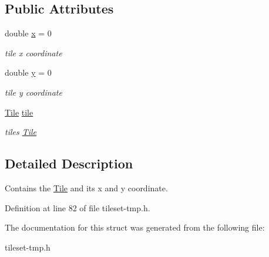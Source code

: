 \subsection*{Public Attributes}
\begin{DoxyCompactItemize}
\item 
double \hyperlink{structTileset_1_1tile_a1ef99a135c4524cdb6074f4f465e11fb}{x} = 0\hypertarget{structTileset_1_1tile_a1ef99a135c4524cdb6074f4f465e11fb}{}\label{structTileset_1_1tile_a1ef99a135c4524cdb6074f4f465e11fb}

\begin{DoxyCompactList}\small\item\em tile x coordinate \end{DoxyCompactList}\item 
double \hyperlink{structTileset_1_1tile_af375f25f2d48ed50fc5ce94f382d0f1e}{y} = 0\hypertarget{structTileset_1_1tile_af375f25f2d48ed50fc5ce94f382d0f1e}{}\label{structTileset_1_1tile_af375f25f2d48ed50fc5ce94f382d0f1e}

\begin{DoxyCompactList}\small\item\em tile y coordinate \end{DoxyCompactList}\item 
\hyperlink{classTile}{Tile} \hyperlink{structTileset_1_1tile_a31c903cd12d0f061e2e0c7b8c3577153}{tile}\hypertarget{structTileset_1_1tile_a31c903cd12d0f061e2e0c7b8c3577153}{}\label{structTileset_1_1tile_a31c903cd12d0f061e2e0c7b8c3577153}

\begin{DoxyCompactList}\small\item\em tile\textquotesingle{}s \hyperlink{classTile}{Tile} \end{DoxyCompactList}\end{DoxyCompactItemize}


\subsection{Detailed Description}
Contains the \hyperlink{classTile}{Tile} and its x and y coordinate. 

Definition at line 82 of file tileset-\/tmp.\+h.



The documentation for this struct was generated from the following file\+:\begin{DoxyCompactItemize}
\item 
tileset-\/tmp.\+h\end{DoxyCompactItemize}
